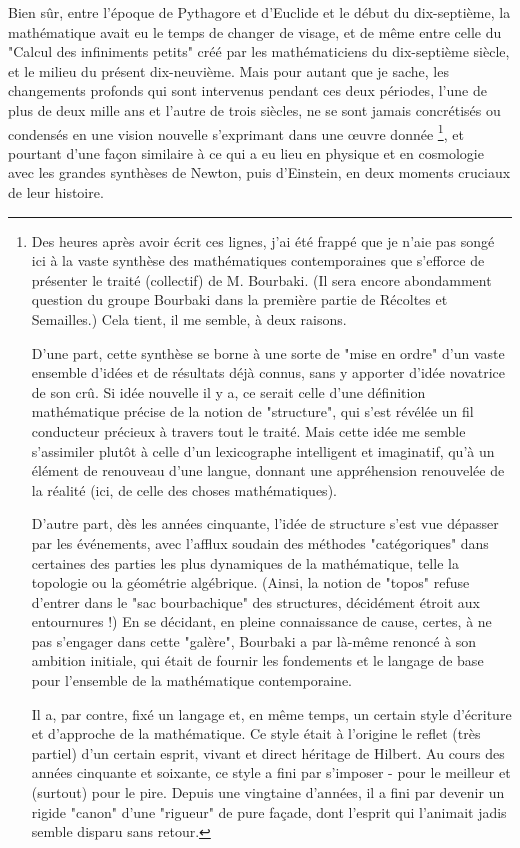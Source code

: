 Bien sûr, entre l'époque de Pythagore et d'Euclide et le début du dix-septième, la mathématique avait eu le temps de changer de visage, et de même entre celle du "Calcul des infiniments petits" créé par les mathématiciens du dix-septième siècle, et le milieu du présent dix-neuvième. Mais pour autant que je sache, les changements profonds qui sont intervenus pendant ces deux périodes, l'une de plus de deux mille ans et l'autre de trois siècles, ne se sont jamais concrétisés ou condensés en une vision nouvelle s'exprimant dans une œuvre donnée \footnote{Des heures après avoir écrit ces lignes, j'ai été frappé que je n'aie pas songé ici à la vaste synthèse des mathématiques contemporaines que s'efforce de présenter le traité (collectif) de M. Bourbaki. (Il sera encore abondamment question du groupe Bourbaki dans la première partie de Récoltes et Semailles.) Cela tient, il me semble, à deux raisons.

D'une part, cette synthèse se borne à une sorte de "mise en ordre" d'un vaste ensemble d'idées et de résultats déjà connus, sans y apporter d'idée novatrice de son crû. Si idée nouvelle il y a, ce serait celle d'une définition mathématique précise de la notion de "structure", qui s'est révélée un fil conducteur précieux à travers tout le traité. Mais cette idée me semble s'assimiler plutôt à celle d'un lexicographe intelligent et imaginatif, qu'à un élément de renouveau d'une langue, donnant une appréhension renouvelée de la réalité (ici, de celle des choses mathématiques).

D'autre part, dès les années cinquante, l'idée de structure s'est vue dépasser par les événements, avec l'afflux soudain des méthodes "catégoriques" dans certaines des parties les plus dynamiques de la mathématique, telle la topologie ou la géométrie algébrique. (Ainsi, la notion de "topos" refuse d'entrer dans le "sac bourbachique" des structures, décidément étroit aux entournures !) En se décidant, en pleine connaissance de cause, certes, à ne pas s'engager dans cette "galère", Bourbaki a par là-même renoncé à son ambition initiale, qui était de fournir les fondements et le langage de base pour l'ensemble de la mathématique contemporaine.

Il a, par contre, fixé un langage et, en même temps, un certain style d'écriture et d'approche de la mathématique. Ce style était à l'origine le reflet (très partiel) d'un certain esprit, vivant et direct héritage de Hilbert. Au cours des années cinquante et soixante, ce style a fini par s'imposer - pour le meilleur et (surtout) pour le pire. Depuis une vingtaine d'années, il a fini par devenir un rigide "canon" d'une "rigueur" de pure façade, dont l'esprit qui l'animait jadis semble disparu sans retour.}, et pourtant d'une façon similaire à ce qui a eu lieu en physique et en cosmologie avec les grandes synthèses de Newton, puis d'Einstein, en deux moments cruciaux de leur histoire.

